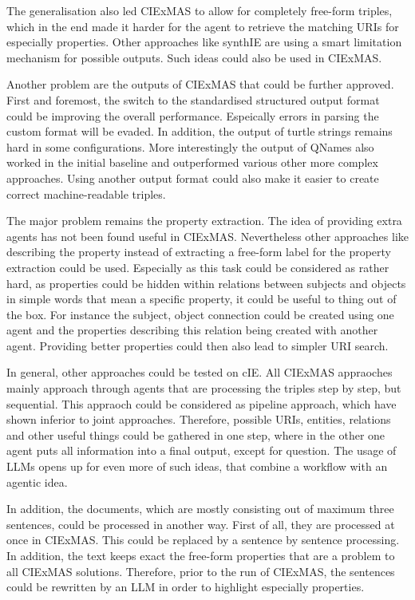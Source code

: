 \documentclass[a4paper,oneside,bibliography=totoc]{scrbook}
\begin{document}
The generalisation also led CIExMAS to allow for completely free-form triples, which in the end made it harder for the agent to retrieve the matching URIs for especially properties. Other approaches like synthIE are using a smart limitation mechanism for possible outputs. Such ideas could also be used in CIExMAS.

Another problem are the outputs of CIExMAS that could be further approved. First and foremost, the switch to the standardised structured output format could be improving the overall performance. Espeically errors in parsing the custom format will be evaded. In addition, the output of turtle strings remains hard in some configurations. More interestingly the output of QNames also worked in the initial baseline and outperformed various other more complex approaches. Using another output format could also make it easier to create correct machine-readable triples.

The major problem remains the property extraction. The idea of providing extra agents has not been found useful in CIExMAS. Nevertheless other approaches like describing the property instead of extracting a free-form label for the property extraction could be used. Especially as this task could be considered as rather hard, as properties could be hidden within relations between subjects and objects in simple words that mean a specific property, it could be useful to thing out of the box. For instance the subject, object connection could be created using one agent and the properties describing this relation being created with another agent. Providing better properties could then also lead to simpler URI search.

In general, other approaches could be tested on \ac{cIE}. All CIExMAS appraoches mainly approach through agents that are processing the triples step by step, but sequential. This appraoch could be considered as pipeline approach, which have shown inferior to joint approaches. Therefore, possible URIs, entities, relations and other useful things could be gathered in one step, where in the other one agent puts all information into a final output, except for question. The usage of \acp{LLM} opens up for even more of such ideas, that combine a workflow with an agentic idea.

In addition, the documents, which are mostly consisting out of maximum three sentences, could be processed in another way. First of all, they are processed at once in CIExMAS. This could be replaced by a sentence by sentence processing. In addition, the text keeps exact the free-form properties that are a problem to all CIExMAS solutions. Therefore, prior to the run of CIExMAS, the sentences could be rewritten by an \ac{LLM} in order to highlight especially properties.
\end{document}
